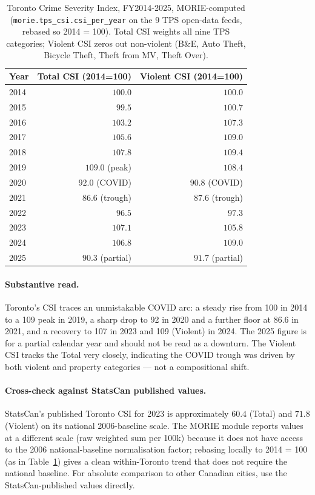 \documentclass[11pt,a4paper]{article}
\newcommand{\1}{\mathbf{1}}
\theoremstyle{plain}
\theoremstyle{definition}
\begin{document}
\begin{table}[h]
\centering\footnotesize
\caption{Toronto Crime Severity Index, FY2014-2025, MORIE-computed
(\texttt{morie.tps\_csi.csi\_per\_year} on the 9 TPS open-data
feeds, rebased so 2014 = 100).  Total CSI weights all nine TPS
categories; Violent CSI zeros out non-violent (B\&E, Auto Theft,
Bicycle Theft, Theft from MV, Theft Over).
}\label{tab:csi-toronto}
\begin{tabular}{lrr}
\toprule
Year & Total CSI (2014=100) & Violent CSI (2014=100)\\\midrule
2014 & $100.0$ & $100.0$\\
2015 & $\phantom{0}99.5$ & $100.7$\\
2016 & $103.2$ & $107.3$\\
2017 & $105.6$ & $109.0$\\
2018 & $107.8$ & $109.4$\\
2019 & $\mathbf{109.0}$ (peak) & $108.4$\\
2020 & $\phantom{0}92.0$ (COVID) & $\phantom{0}90.8$ (COVID)\\
2021 & $\phantom{0}86.6$ (trough) & $\phantom{0}87.6$ (trough)\\
2022 & $\phantom{0}96.5$ & $\phantom{0}97.3$\\
2023 & $107.1$ & $105.8$\\
2024 & $106.8$ & $\mathbf{109.0}$\\
2025 & $\phantom{0}90.3$ (partial) & $\phantom{0}91.7$ (partial)\\
\bottomrule
\end{tabular}
\end{table}

\paragraph{Substantive read.}  Toronto's CSI traces an unmistakable
COVID arc: a steady rise from 100 in 2014 to a 109 peak in 2019,
a sharp drop to 92 in 2020 and a further floor at 86.6 in 2021,
and a recovery to 107 in 2023 and 109 (Violent) in 2024.  The
2025 figure is for a partial calendar year and should not be
read as a downturn.  The Violent CSI tracks the Total very
closely, indicating the COVID trough was driven by both violent
and property categories — not a compositional shift.

\paragraph{Cross-check against StatsCan published values.}
StatsCan's published Toronto CSI for 2023 is approximately $60.4$
(Total) and $71.8$ (Violent) on its national 2006-baseline scale.
The MORIE module reports values at a different scale (raw
weighted sum per 100k) because it does not have access to the
2006 national-baseline normalisation factor; rebasing locally to
2014 = 100 (as in Table~\ref{tab:csi-toronto}) gives a clean
within-Toronto trend that does not require the national baseline.
For absolute comparison to other Canadian cities, use the
StatsCan-published values directly.
\end{document}

